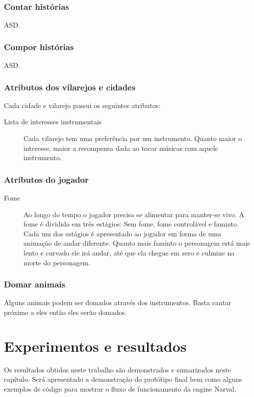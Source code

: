 \documentclass[12pt, 
openright, 
oneside, 
a4paper,    
brazil]{facom-ufu-abntex2}
\begin{document}
\subsection{Contar histórias}
ASD.
\subsection{Compor histórias}
ASD.
\subsection{Atributos dos vilarejos e cidades}
Cada cidade e vilarejo possui os seguintes atributos:
\begin{description}  
\item [Lista de interesses instrumentais] Cada vilarejo tem uma preferência por um instrumento. Quanto maior o interesse, maior a recompensa dada ao tocar músicas com aquele instrumento.
\end{description}

\subsection{Atributos do jogador}
\begin{description}  
\item [Fome] Ao longo do tempo o jogador precisa se alimentar para manter-se vivo. A fome é dividida em três estágios: Sem fome, fome controlável e faminto. Cada um dos estágios é
apresentado ao jogador em forma de uma animação de andar diferente. Quanto mais faminto o personagem está mais lento e curvado ele irá andar, até que ela chegue em zero e culmine na morte do personagem.
\end{description}

\subsection{Domar animais}
Alguns animais podem ser domados através dos instrumentos. Basta cantar próximo a eles então eles serão domados.
\fi


\chapter{Experimentos e resultados}
\label{cap:demonstracao}

Os resultados obtidos neste trabalho são demonstrados e sumarizados neste capítulo. Será apresentado a demonstração do protótipo final bem como alguns exemplos de código para mostrar o fluxo de funcionamento da engine Narval. 
\end{document}
